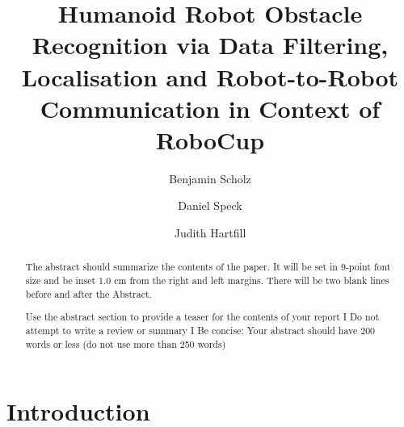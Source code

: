 \documentclass[lnicst,a4paper]{svmultln}
\begin{document}
%
\mainmatter              %
%
\title{Humanoid Robot Obstacle Recognition via Data Filtering, Localisation and Robot-to-Robot Communication in Context of RoboCup} 
%
%
\author{Benjamin Scholz \and Daniel Speck \and Judith Hartfill}
%
%
\tocauthor{}
%

\maketitle              %





\begin{abstract}        %
The abstract should summarize the contents of the paper. It will be set in 9-point
font size and be inset 1.0 cm from the right and left margins.
There will be two blank lines before and after the Abstract.

Use the abstract section to provide a teaser for the contents of your report I Do not attempt to write a review or summary I Be concise: Your abstract should have 200 words or less (do
not use more than 250 words)
\end{abstract}
%





\section{Introduction}
\end{document}
